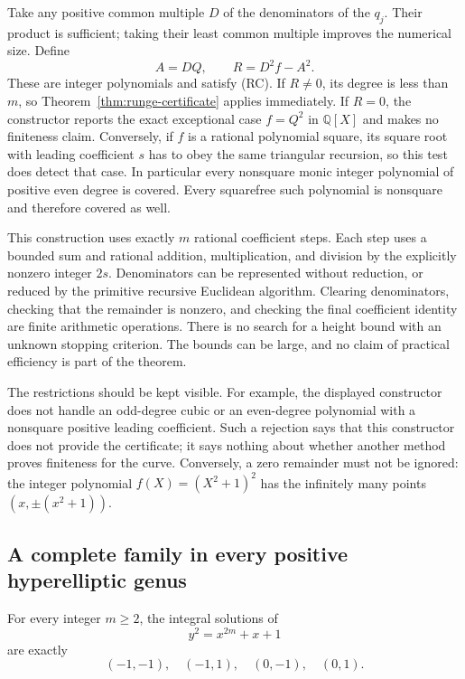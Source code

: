 Take any positive common multiple $D$ of the denominators of the $q_j$.
Their product is sufficient; taking their least common multiple improves
the numerical size.  Define
\[
                        A=DQ,\qquad R=D^2f-A^2.
\]
These are integer polynomials and satisfy (RC).  If $R\neq0$, its degree is
less than $m$, so Theorem~\ref{thm:runge-certificate} applies immediately.
If $R=0$, the constructor reports the exact exceptional case
$f=Q^2$ in $\mathbb Q[X]$ and makes no finiteness claim.  Conversely, if
$f$ is a rational polynomial square, its square root with leading
coefficient $s$ has to obey the same triangular recursion, so this test
does detect that case.  In particular every nonsquare monic integer
polynomial of positive even degree is covered.  Every squarefree such
polynomial is nonsquare and therefore covered as well.

This construction uses exactly $m$ rational coefficient steps.  Each step
uses a bounded sum and rational addition, multiplication, and division by
the explicitly nonzero integer $2s$.  Denominators can be represented
without reduction, or reduced by the primitive recursive Euclidean
algorithm.  Clearing denominators, checking that the remainder is nonzero,
and checking the final coefficient identity are finite arithmetic
operations.  There is no search for a height bound with an unknown stopping
criterion.  The bounds can be large, and no claim of practical efficiency
is part of the theorem.

The restrictions should be kept visible.  For example, the displayed
constructor does not handle an odd-degree cubic or an even-degree
polynomial with a nonsquare positive leading coefficient.  Such a
rejection says that this constructor does not provide the certificate;
it says nothing about whether another method proves finiteness for the
curve.  Conversely, a zero remainder must not be ignored: the integer
polynomial $f(X)=(X^2+1)^2$ has the infinitely many points
$(x,\pm(x^2+1))$.

\subsection{A complete family in every positive hyperelliptic genus}

\begin{theorem}
\label{thm:runge-all-genera}
For every integer $m\geq2$, the integral solutions of
\[
                         y^2=x^{2m}+x+1
\]
are exactly
\[
                    (-1,-1),\quad(-1,1),\quad(0,-1),\quad(0,1).
\]
\end{theorem}

